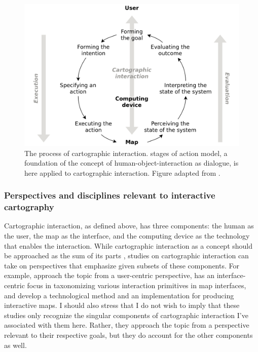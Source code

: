 \begin{figure}[H]
	\centering
	\includegraphics[width=\diagramwidth]{visual/figures/diagrams/map_interaction.png}
	\caption{
		The process of cartographic interaction.
		 stages of action model,
		a foundation of the concept of human-object-interaction as dialogue,
		is here applied to cartographic interaction.
		Figure adapted from \textcite{rot2012}.
	}
	\label{fig:map interaction}
\end{figure}


\subsubsection{Perspectives and disciplines relevant to interactive cartography}

Cartographic interaction, as defined above, has three components:
the human as the user, the map as the interface,
and the computing device as the technology that enables the interaction.
While cartographic interaction as a concept should be approached as
the sum of its parts \parencite{rot2013b},
studies on cartographic interaction can take on perspectives
that emphasize given subsets of these components.
For example, \textcite{col2009} approach the topic from a user-centric perspective,
\textcite{rot2013a} has an interface-centric focus in
taxonomizing various interaction primitives in map interfaces,
and \textcite{oym2021} develop a technological method and an implementation
for producing interactive maps.
I should also stress that I do not wish to imply that these studies
only recognize the singular components of cartographic interaction
I've associated with them here.
Rather, they approach the topic from a perspective relevant to their respective goals,
but they do account for the other components as well.

